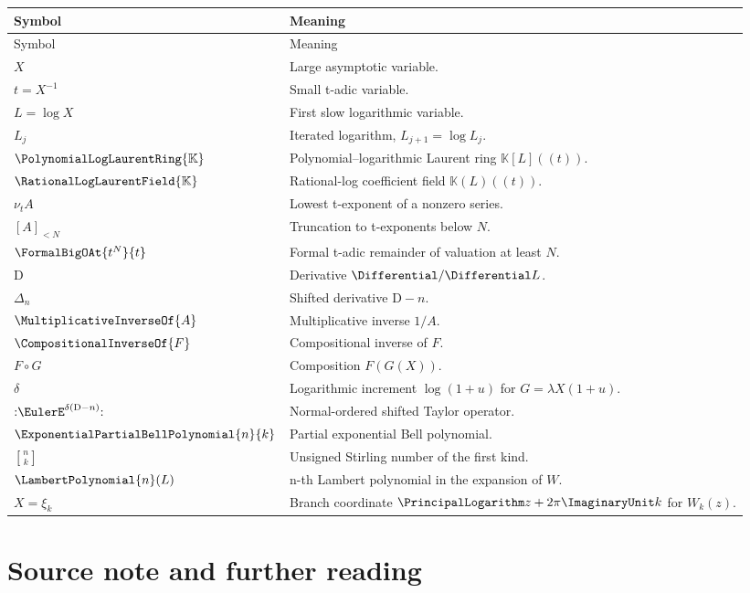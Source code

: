 \documentclass[11pt,openany]{book}
\theoremstyle{definition}
\theoremstyle{plain}
\theoremstyle{remark}
\newcommand{\K}{\mathbb{K}}
\newcommand{\val}{\nu}
\newcommand{\rev}[1]{\CompositionalInverseOf{#1}}
\newcommand{\recip}[1]{\MultiplicativeInverseOf{#1}}
\newcommand{\stirlingone}[2]{\genfrac{[}{]}{0pt}{}{#1}{#2}}
\newcommand{\Dop}{\mathrm{D}}
\newcommand{\compose}{\mathbin{\circ}}
\begin{document}
\begin{longtable}{@{}p{}p{}@{}}
\toprule
Symbol & Meaning \\
\midrule
\endfirsthead
\toprule
Symbol & Meaning \\
\midrule
\endhead
\(X\) & Large asymptotic variable. \\
\(t=X^{-1}\) & Small t-adic variable. \\
\(L=\log X\) & First slow logarithmic variable. \\
\(L_j\) & Iterated logarithm, \(L_{j+1}=\log L_j\). \\
\(\PolynomialLogLaurentRing{\K}\) & Polynomial--logarithmic Laurent ring \(\K[L]((t))\). \\
\(\RationalLogLaurentField{\K}\) & Rational-log coefficient field \(\K(L)((t))\). \\
\(\val_t A\) & Lowest t-exponent of a nonzero series. \\
\([A]_{<N}\) & Truncation to t-exponents below \(N\). \\
\(\FormalBigOAt{t^N}{t}\) & Formal t-adic remainder of valuation at least \(N\). \\
\(\Dop\) & Derivative \(\Differential/\Differential L\). \\
\(\Delta_n\) & Shifted derivative \(\Dop-n\). \\
\(\recip A\) & Multiplicative inverse \(1/A\). \\
\(\rev F\) & Compositional inverse of \(F\). \\
\(F\compose G\) & Composition \(F(G(X))\). \\
\(\delta\) & Logarithmic increment \(\log(1+u)\) for
\(G=\lambda X(1+u)\). \\
\(\mathopen{:}\EulerE^{\delta(\Dop-n)}\mathclose{:}\) & Normal-ordered shifted
Taylor operator. \\
\(\ExponentialPartialBellPolynomial{n}{k}\) & Partial exponential Bell polynomial. \\
\(\stirlingone{n}{k}\) & Unsigned Stirling number of the first kind. \\
\(\LambertPolynomial{n}(L)\) & n-th Lambert polynomial in the expansion of \(W\). \\
\(X=\xi_k\) & Branch coordinate \(\PrincipalLogarithm z+2\pi\ImaginaryUnit k\) for \(W_k(z)\). \\
\bottomrule
\end{longtable}


\backmatter

\chapter*{Source note and further reading}
\end{document}
